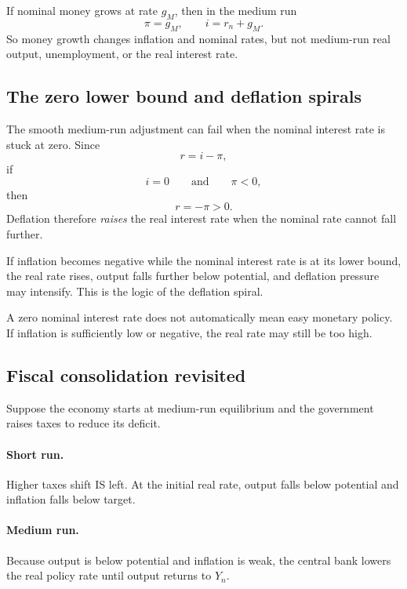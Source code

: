 \documentclass[12pt]{article}
\begin{document}
\begin{keyformula}[title={Key Formula: Money-growth result}]
If nominal money grows at rate \(g_M\), then in the medium run
\[
\pi=g_M,
\qquad
i=r_n+g_M.
\]
So money growth changes inflation and nominal rates, but not medium-run real output, unemployment, or the real interest rate.
\end{keyformula}

\subsection{The zero lower bound and deflation spirals}

The smooth medium-run adjustment can fail when the nominal interest rate is stuck at zero. Since
\[
r=i-\pi,
\]
if
\[
i=0
\qquad\text{and}\qquad
\pi<0,
\]
then
\[
r=-\pi>0.
\]
Deflation therefore \emph{raises} the real interest rate when the nominal rate cannot fall further.

\begin{policynote}[title={Policy Application: Deflation spiral}]
If inflation becomes negative while the nominal interest rate is at its lower bound, the real rate rises, output falls further below potential, and deflation pressure may intensify. This is the logic of the deflation spiral.
\end{policynote}

\begin{commonmistake}
A zero nominal interest rate does not automatically mean easy monetary policy. If inflation is sufficiently low or negative, the real rate may still be too high.
\end{commonmistake}

\newpage
\subsection{Fiscal consolidation revisited}

Suppose the economy starts at medium-run equilibrium and the government raises taxes to reduce its deficit.

\paragraph{Short run.}
Higher taxes shift IS left. At the initial real rate, output falls below potential and inflation falls below target.

\paragraph{Medium run.}
Because output is below potential and inflation is weak, the central bank lowers the real policy rate until output returns to $Y_n$.
\end{document}
